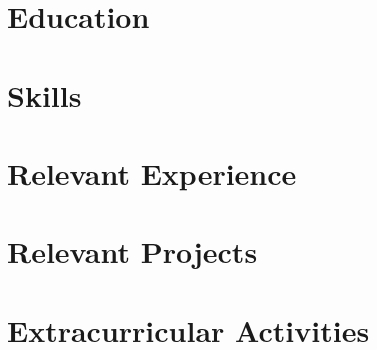 \documentclass[letterpaper,8pt]{article}
\begin{document}


\vspace{-4mm} %
% 

\vspace{-3mm} %
\section{Education}


\vspace{-4mm} %

\section{Skills}
\vspace{-0.5mm} %


\vspace{-6mm} %
\section{Relevant Experience}
\resumeSubHeadingListStart
      
      
      
      
      
% 
  \resumeSubHeadingListEnd

  \vspace{-4.1mm} %

\section{Relevant Projects}
    \resumeSubHeadingListStart

    
    
    
    
    
    
    
    

    \resumeSubHeadingListEnd
  \vspace{-5mm} %

\section{Extracurricular Activities }

    
\end{document}
